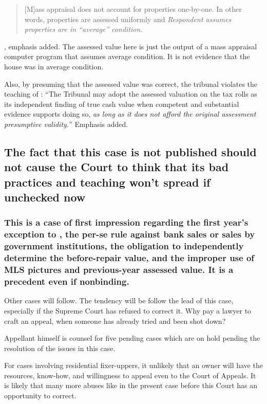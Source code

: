 \documentclass[12pt,\documentclassflag]{michiganCourtOfAppealsBrief}
\begin{document}
\begin{quote}
  [M]ass appraisal does not account for properties one-by-one. In other words, properties are assessed uniformly and \emph{Respondent assumes properties are in ``average'' condition.}
\end{quote}
\foj[4], emphasis added. The assessed value here is just the output of a mass appraisal computer program that assumes average condition. It is not evidence that the house was in average condition.

Also, by presuming that the assessed value was correct,  the tribunal violates the teaching of : ``The Tribunal may adopt the assessed valuation on the tax rolls as its independent finding of true cash value when competent and substantial evidence supports doing so, \emph{as long as it does not afford the original assessment presumptive validity.}'' Emphasis added.




\subsection{The fact that this case is not published should not cause the Court to think that its bad practices and teaching won't spread if unchecked now}

\subsubsection{This is a case of first impression regarding the first year's exception to \mathieuGast, the per-se rule against bank sales or sales by government institutions, the obligation to independently determine the before-repair value, and the improper use of MLS pictures and previous-year assessed value. It is a precedent even if nonbinding.}

Other cases will follow. The tendency will be follow the lead of this case, especially if the Supreme Court has refused to correct it. Why pay a lawyer to craft an appeal, when someone has already tried and been shot down?

Appellant himself is counsel for five pending cases which are on hold pending the resolution of the issues in this case.

For cases involving residential fixer-uppers, it unlikely that an owner will have the resources, know-how, and willingness to appeal even to the Court of Appeals. It is likely that many more abuses like in the present case before this Court has an opportunity to correct.
\end{document}
